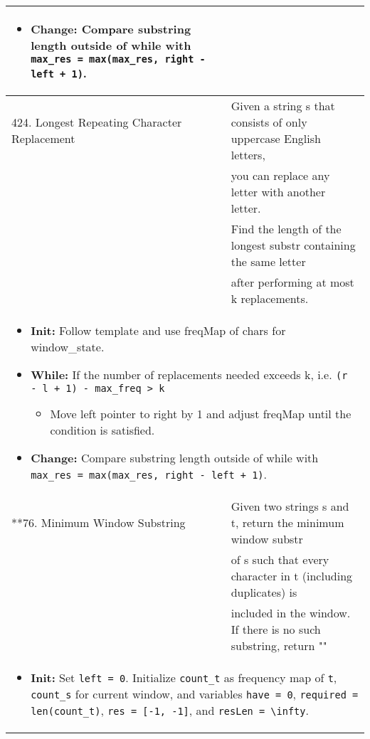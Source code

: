 \begin{summary}
\begin{center}
\begin{tabular}{ll}
{\begin{itemize}
                    \item \textbf{Change:} Compare substring length outside of while with \texttt{max\_res = max(max\_res, right - left + 1)}.
                \end{itemize}
            } \\
            \midrule
            424. Longest Repeating Character Replacement & Given a string s that consists of only uppercase English letters, \\
            & you can replace any letter with another letter. \\
            & Find the length of the longest substr containing the same letter \\
            & after performing at most k replacements. \\
            \multicolumn{2}{p{\linewidth}}{
                \begin{itemize}
                    \item \textbf{Init:} Follow template and use freqMap of chars for window\_state.
                    \item \textbf{While:} If the number of replacements needed exceeds k, i.e. \texttt{(r - l + 1) - max\_freq > k}
                    \begin{itemize}
                        \item Move left pointer to right by 1 and adjust freqMap until the condition is satisfied.
                    \end{itemize}
                    \item \textbf{Change:} Compare substring length outside of while with \texttt{max\_res = max(max\_res, right - left + 1)}.
                \end{itemize}
            } \\
            \midrule
            **76. Minimum Window Substring & Given two strings s and t, return the minimum window substr \\
            & of s such that every character in t (including duplicates) is \\
            & included in the window. If there is no such substring, return "" \\
            \multicolumn{2}{p{\linewidth}}{
                \begin{itemize}
                    \item \textbf{Init:} Set \texttt{left = 0}. Initialize \texttt{count\_t} as frequency map of \texttt{t}, \texttt{count\_s} for current window, and variables \texttt{have = 0}, \texttt{required = len(count\_t)}, \texttt{res = [-1, -1]}, and \texttt{resLen = \textbackslash infty}.
                    

\end{itemize}}
\end{tabular}
\end{center}
\end{summary}
